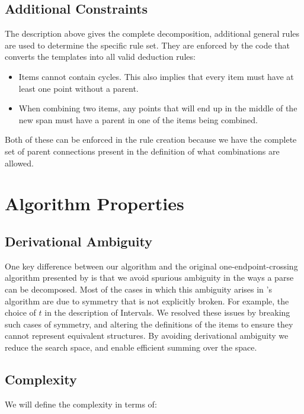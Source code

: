 \subsection{Additional Constraints}
The description above gives the complete decomposition, additional general rules are used to determine the specific rule set.
They are enforced by the code that converts the templates into all valid deduction rules:

\begin{itemize}
  \item Items cannot contain cycles.
  This also implies that every item must have at least one point without a parent.
  \item When combining two items, any points that will end up in the middle of the new span must have a parent in one of the items being combined.
\end{itemize}

Both of these can be enforced in the rule creation because we have the complete set of parent connections present in the definition of what combinations are allowed.

\section{Algorithm Properties} \label{sec:algorithm-properties}

\subsection{Derivational Ambiguity}

One key difference between our algorithm and the original one-endpoint-crossing algorithm presented by \textcite{ec} is that we avoid spurious ambiguity in the ways a parse can be decomposed.
Most of the cases in which this ambiguity arises in \textcite{ec}'s algorithm are due to symmetry that is not explicitly broken.
For example, the choice of $t$ in the description of Intervals.
We resolved these issues by breaking such cases of symmetry, and altering the definitions of the items to ensure they cannot represent equivalent structures.
By avoiding derivational ambiguity we reduce the search space, and enable efficient summing over the space.

\subsection{Complexity}

We will define the complexity in terms of:

